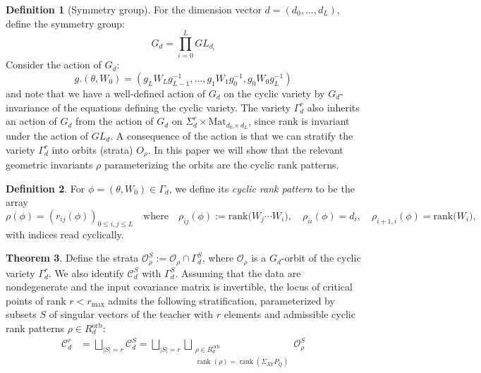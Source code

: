 \documentclass[11pt]{article}
\theoremstyle{definition}
\newtheorem{theorem}{Theorem}[section]
\newtheorem{definition}[theorem]{Definition}
\begin{document}
\begin{definition}[Symmetry group]
For the dimension vector \(d=(d_0,\ldots,d_L)\), define the symmetry group:
\[
G_d = \prod_{i=0}^{L} GL_{d_i}
\]
Consider the action of \(G_d\):
\[
g.(\theta, W_0) = (g_L W_L g_{L-1}^{-1}, \dots, g_1 W_1 g_0^{-1}, g_0 W_0g_L^{-1})
\]
and note that we have a well-defined action of \(G_d\) on the cyclic variety by \(G_d\)-invariance of the equations defining the cyclic variety. The variety \(\Gamma_d^r\) also inherits an action of \(G_d\) from the action of \(G_d\) on \(\Sigma_d^r \times \text{Mat}_{d_0 \times d_L}\), since rank is invariant under the action of \(GL_d\). A consequence of the action is that we can stratify the variety \(\Gamma^r_d\) into orbits (strata) \(O_{\rho}\). In this paper we will show that the relevant geometric invariants \(\rho\) parameterizing the orbits are the cyclic rank patterns.
\end{definition}
\begin{definition}\label{def:cyclic-rank-pattern}
For \(\phi = (\theta,W_0)\in\Gamma_{d}\), we define its \emph{cyclic rank pattern} to be the array
\[
\rho(\phi)=(r_{ij}(\phi))_{0\le i,j\le L}
\quad\text{where}\quad
\rho_{ij}(\phi):=\mathrm{rank}\bigl(W_{j}\cdots W_i\bigr),
\quad
\rho_{ii}(\phi)=d_i,
\quad
\rho_{i+1,i}(\phi)=\mathrm{rank}\bigl(W_i\bigr),
\]
with indices read cyclically.
\end{definition}
\begin{theorem}\label{main-result}
Define the strata \(\mathcal O^S_{\rho} := \mathcal O_{\rho} \cap \Gamma^S_{d}\), where \(\mathcal{O}_{\rho}\) is a \(G_d\)-orbit of the cyclic variety \(\Gamma^r_{d}\). We also identify \(\mathcal{C}_d^S\) with \(\Gamma^S_{d}\).
Assuming that the data are nondegenerate and the input covariance matrix is invertible, the locus of critical points of rank \(r<r_\text{max}\) admits the following stratification, parameterized by subsets \(S\) of singular vectors of the teacher with \(r\) elements and admissible cyclic rank patterns \(\rho\in R_d^{\mathrm{orb}}\):
\begin{align*}
  \mathcal{C}^r_d & = \bigsqcup_{|S|=r}\mathcal{C}^S_d = \bigsqcup_{|S|=r}\bigsqcup_{\substack{\rho\in R_d^{\mathrm{orb}}\\ \operatorname{rank}(\rho)=\operatorname{rank}(\Sigma_{XY}P_Q)}} \mathcal{O}^S_{\rho} \\
\end{align*}
\end{theorem}
\end{document}
